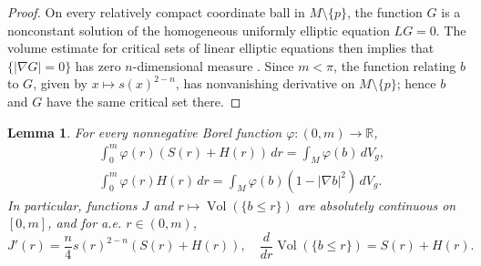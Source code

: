 \documentclass[11pt]{amsart}
\theoremstyle{plain}
\newtheorem{lemma}[theorem]{Lemma}
\numberwithin{equation}{section}
\newcommand{\R}{\mathbb{R}}
\DeclareMathOperator{\vol}{Vol}
\newcommand{\bsls}{\{b\le r\}}
\begin{document}
\begin{proof}
On every relatively compact coordinate ball in $M\setminus\{p\}$, the function $G$ is a nonconstant solution of the homogeneous uniformly elliptic equation $LG=0$. The volume estimate for critical sets of linear elliptic equations then implies that $\{|\nabla G|=0\}$ has zero $n$-dimensional measure \cite{NaberValtorta2017}. Since $m<\pi$, the function relating $b$ to $G$, given by $x \mapsto s(x)^{2-n}$, has nonvanishing derivative on $M\setminus\{p\}$; hence $b$ and $G$ have the same critical set there.
\end{proof}

\begin{lemma}\label{lem:coarea}
For every nonnegative Borel function $\varphi:(0,m)\rightarrow\R$,
\begin{equation}\label{eq:3.3}
\begin{aligned}
&\int_0^m \varphi(r)(S(r)+H(r))\,dr=\int_M\varphi(b)\,dV_g, \\
&\int_0^m\varphi(r) H(r)\,dr=\int_M\varphi(b)(1-|\nabla b|^2)\,dV_g.
\end{aligned}
\end{equation}
In particular, functions $J$ and $r\mapsto \vol(\{b\le r\})$ are absolutely continuous on $[0,m]$, and for a.e. $r\in(0,m)$,
\begin{equation}\label{eq:3.4}
J'(r)=\frac{n}{4}s(r)^{2-n}(S(r)+H(r)),\quad \frac{d}{dr}\vol(\bsls)=S(r)+H(r).
\end{equation}
\end{lemma}
\end{document}
